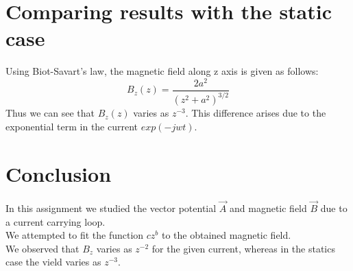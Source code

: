 \documentclass[11pt, a4paper]{article}
\begin{document}
\section{Comparing results with the static case}
Using Biot-Savart's law, the magnetic field along z axis is given as follows:
\begin{equation}
B_z(z) = \frac{2a^2}{(z^2 + a^2)^{3/2}}
\end{equation}
Thus we can see that $B_z(z)$ varies as $z^{-3}$. This difference arises due to the exponential term in the current $exp(-jwt)$.


\section{Conclusion}
In this assignment we studied the vector potential $\vec{A}$ and magnetic field $\vec{B}$ due to a current carrying loop.\\
We attempted to fit the function $cz^b$ to the obtained magnetic field.\\
We observed that $B_z$ varies as $z^{-2}$ for the given current, whereas in the statics case the vield varies as  $z^{-3}$. 
\end{document}
